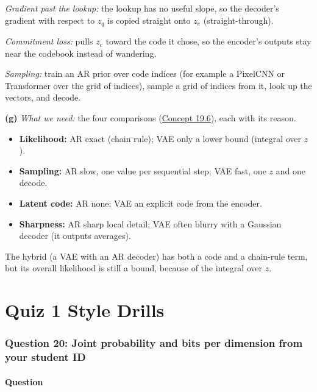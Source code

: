 \documentclass[12pt,a4paper]{article}
\begin{document}
\emph{Gradient past the lookup:} the lookup has no useful slope, so the decoder's gradient with respect to $z_q$ is copied straight onto $z_e$ (straight-through).

\emph{Commitment loss:} pulls $z_e$ toward the code it chose, so the encoder's outputs stay near the codebook instead of wandering.

\emph{Sampling:} train an AR prior over code indices (for example a PixelCNN or Transformer over the grid of indices), sample a grid of indices from it, look up the vectors, and decode.

\textbf{(g)} \emph{What we need:} the four comparisons (\hyperref[c19-6]{Concept 19.6}), each with its reason.
\begin{itemize}[nosep]
  \item \textbf{Likelihood:} AR exact (chain rule); VAE only a lower bound (integral over $z$).
  \item \textbf{Sampling:} AR slow, one value per sequential step; VAE fast, one $z$ and one decode.
  \item \textbf{Latent code:} AR none; VAE an explicit code from the encoder.
  \item \textbf{Sharpness:} AR sharp local detail; VAE often blurry with a Gaussian decoder (it outputs averages).
\end{itemize}
The hybrid (a VAE with an AR decoder) has both a code and a chain-rule term, but its overall likelihood is still a bound, because of the integral over $z$.
\part{Quiz 1 Style Drills}

\section{Question 20: Joint probability and bits per dimension from your student ID}

\subsection{Question}
\end{document}
